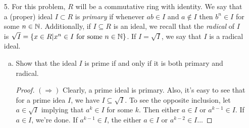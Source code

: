 \begin{itemize}
\begin{enumerate}[(a)]
\begin{enumerate}[(i)]
\begin{proof}
        In fact, many inclusion maps give the same type of counterexample: for $\phi : \bbz \rar \bbz[x]$, the ideal $2\bbz$ maps to a non-ideal.
        \end{proof}
        
        \item Prove that if $\varphi$ is surjective, then the image $\varphi(I)$ of $I$ is an ideal of $S$.
        \begin{proof}
        Suppose $\varphi$ is surjective. Trivially, $\varphi(0) \in \varphi(I)$.
        Let $x,y \in \varphi(I)$ s.t. $x = \varphi(a)$ and $y = \varphi(b)$ for some $a,b \in I$. Then
        \[x-y = \varphi(a) - \varphi(b) = \varphi(a-b) \in \varphi(I).\]
        By surjectivity, for any $s \in S$ there exists some $r \in R$ s.t. $s = \varphi(r)$. Then
        \[sx = \varphi(r) \varphi(a) = \varphi(ar) \in \varphi(I).\]
        Likewise, $xs \in \varphi(I)$, hence $\varphi(I)$ is an ideal of $S$.
        \end{proof}
        
        \item Suppose that $I$ is a prime ideal and $\varphi$ is surjective. Prove that if $\Kern(\varphi) \subseteq I$, then the image of $I$ is a prime ideal of $S$.
        \begin{proof}

        \end{proof}
    \end{enumerate}
\end{enumerate}






\item[5.] For this problem, $R$ will be a commutative ring with identity. We say that a (proper) ideal $I \subset R$ is \textit{primary} if whenever $ab \in I$ and $a \not\in I$ then $b^n \in I$ for some $n \in \mathbb{N}$. Additionally, if $I \subseteq R$ is an ideal, we recall that the \textit{radical} of $I$ is $\sqrt{I} = \{x \in R | x^n \in I \text{ for some } n \in \mathbb{N}\}$. If $I = \sqrt{I}$, we say that $I$ is a radical ideal.
\begin{enumerate}[(a)]
\item Show that the ideal $I$ is prime if and only if it is both primary and radical.
\begin{proof}
$(\Rightarrow)$ Clearly, a prime ideal is primary. Also, it's easy to see that for a prime idea $I$, we have $I \subseteq \sqrt{I}$. To see the opposite inclusion, let $a \in \sqrt{I}$ implying that $a^k \in I$ for some $k$. Then either $a \in I$ or $a^{k-1} \in I$. If $a \in I$, we're done. If $a^{k-1} \in I$, the either $a \in I$ or $a^{k-2} \in I$...


\end{proof}
\end{enumerate}
\end{itemize}
